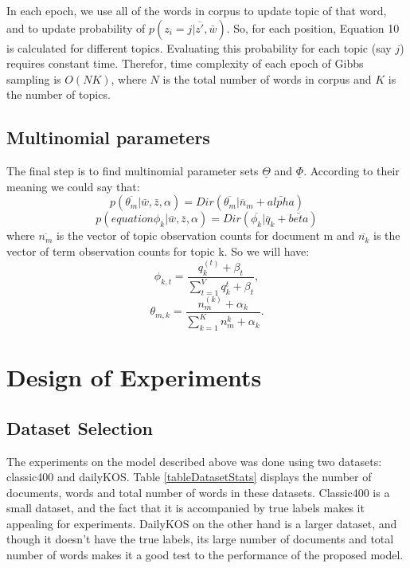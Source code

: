 \documentclass[twoside,12pt]{article}
\begin{document}
In each epoch, we use all of the words in corpus to update topic of that word, and to update probability of $p(z_i=j|\overline{z'},\bar{w})$. So, for each position, Equation 10 is calculated for different topics. Evaluating this probability for each topic (say $j$) requires constant time. Therefor, time complexity of each epoch of Gibbs sampling is $O(NK)$, where $N$ is the total number of words in corpus and $K$ is the number of topics.

\subsection{Multinomial parameters}
The final step is to find multinomial parameter sets $\underline{\Theta}$ and $\underline{\Phi}$. According to their meaning we could say that:
\begin{equation}
p(\overline{\theta_m}|\bar{w},\bar{z},\alpha)=Dir(\overline{\theta_m}|\overline{n}_m+\bar{alpha})
\end{equation}
\begin{equation}
p(equation{\phi_k}|\bar{w},\bar{z},\alpha)=Dir(\overline{\phi_k}|\overline{q}_k+\bar{beta})
\end{equation}
where $\overline{n_m}$ is the vector of topic observation counts for document m and $\overline{n_k}$ is the vector of term observation counts for topic k. So we will have:
\begin{equation}
\phi_{k,t}=\frac{q_k^{(t)}+\beta_t}{\sum_{t=1}^V q_k^{t}+\beta_t},
\end{equation}
\begin{equation}
\theta_{m,k}=\frac{n_m^{(k)}+\alpha_k}{\sum_{k=1}^K n_m^{k}+\alpha_k}.
\end{equation}

\section{Design of Experiments}

\subsection{Dataset Selection}
The experiments on the model described above was done using two datasets: classic400 and dailyKOS. Table \ref{tableDatasetStats} displays the number of documents, words and total number of words in these datasets. Classic400 is a small dataset, and the fact that it is accompanied by true labels makes it appealing for experiments. DailyKOS on the other hand is a larger dataset, and though it doesn't have the true labels, its large number of documents and total number of words makes it a good test to the performance of the proposed model. 
\end{document}

